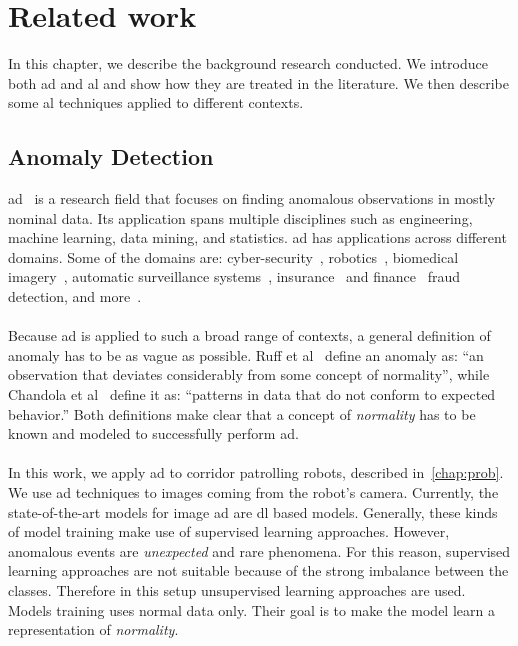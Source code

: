 \chapter{Related work}
\label{chap:rel-work}

In this chapter, we describe the background research conducted. We introduce both \acrfull{ad} and \acrfull{al} and show how they are treated in the literature. We then describe some \acrshort{al} techniques applied to different contexts.

\section{Anomaly Detection}
\acrfull{ad}~\cite{ruff2021unifying} is a research field that focuses on finding anomalous observations in mostly nominal data. Its application spans multiple disciplines such as engineering, machine learning, data mining, and statistics. \acrshort{ad} has applications across different domains. Some of the domains are: cyber-security~\cite{ruff2021unifying, liao2013intrusion, xin2018machine}, robotics~\cite{mantegazza2022outlier, wellhausen2020safe}, biomedical imagery~\cite{schlegl2019f}, automatic surveillance systems~\cite{chakravarty2007anomaly}, insurance~\cite{van2016outlier} and finance~\cite{ahmed2016survey} fraud detection, and more~\cite{ruff2021unifying}.
\\
\\
Because \acrshort{ad} is applied to such a broad range of contexts, a general definition of anomaly has to be as vague as possible.
Ruff et al~\cite{ruff2021unifying} define an anomaly as: \enquote{an observation that deviates considerably
from some concept of normality}, while Chandola et al~\cite{chandola2009anomaly} define it as: \enquote{patterns in data that do not conform to expected behavior.}
Both definitions make clear that a concept of \emph{normality} has to be known and modeled to successfully perform \acrshort{ad}.
\\
\\
In this work, we apply \acrshort{ad} to corridor patrolling robots, described in~\autoref{chap:prob}. We use \acrshort{ad} techniques to images coming from the robot's camera. Currently, the state-of-the-art models for image \acrshort{ad} are \acrfull{dl} based models. Generally, these kinds of model training make use of supervised learning approaches. However, anomalous events are \emph{unexpected} and rare phenomena. For this reason, supervised learning approaches are not suitable because of the strong imbalance between the classes. Therefore in this setup unsupervised learning approaches are used. Models training uses normal data only. Their goal is to make the model learn a representation of \emph{normality}.


